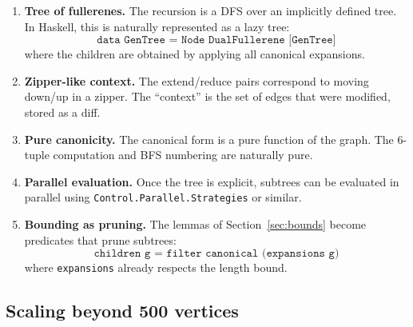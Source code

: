 \documentclass[11pt,a4paper]{article}
\theoremstyle{definition}
\begin{document}
\begin{enumerate}[nosep]
  \item \textbf{Tree of fullerenes.}  The recursion is a DFS over an
    implicitly defined tree.  In Haskell, this is naturally represented
    as a lazy tree:
    \[
      \texttt{data GenTree = Node DualFullerene [GenTree]}
    \]
    where the children are obtained by applying all canonical
    expansions.

  \item \textbf{Zipper-like context.}  The extend/reduce pairs
    correspond to moving down/up in a zipper.  The ``context'' is the
    set of edges that were modified, stored as a diff.

  \item \textbf{Pure canonicity.}  The canonical form is a pure
    function of the graph.  The 6-tuple computation and BFS numbering
    are naturally pure.

  \item \textbf{Parallel evaluation.}  Once the tree is explicit,
    subtrees can be evaluated in parallel using
    \texttt{Control.Parallel.Strategies} or similar.

  \item \textbf{Bounding as pruning.}  The lemmas of
    Section~\ref{sec:bounds} become predicates that prune subtrees:
    \[
      \texttt{children g = filter canonical (expansions g)}
    \]
    where \texttt{expansions} already respects the length bound.
\end{enumerate}

\subsection{Scaling beyond 500 vertices}
\end{document}
